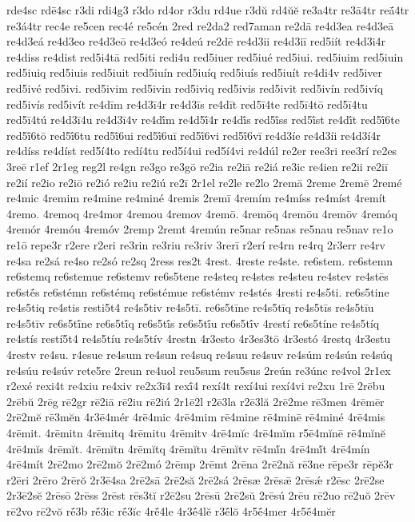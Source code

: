 {rde4sc
rdē4sc
r3di
rdi4g3
r3do
rd4or
r3du
rd4ue
r3dŭ
rd4ŭĕ
re3a4tr
re3ā4tr
reā́4tr
re3á4tr
rec4e
re5cen
rec4é
re5cén
2red
re2da2
red7aman
re2dā
re4d3ea
re4d3eā
re4d3eá
re4d3eo
re4d3eō
re4d3eó
re4deú
re2dē
re4d3ii
re4d3iī
red5iít
re4d3i4r
re4diss
re4dist
red5i4tā
red5iti
redi4u
red5iuer
red5iué
red5iui.
red5iuim
red5iuin
red5iuiq
red5iuis
red5iuit
red5iuín
red5iuíq
red5iuís
red5iuít
re4di4v
red5iver
red5ivé
red5ivi.
red5ivim
red5ivin
red5iviq
red5ivis
red5ivit
red5ivín
red5ivíq
red5ivís
red5ivít
re4dīm
re4d3ī4r
re4d3īs
re4dīt
red5ī4te
red5ī4tō
red5ī4tu
red5ī4tú
re4d3ī4u
re4d3ī4v
re4dī́m
re4d5ī́4r
re4dī́s
red5ī́ss
red5ī́st
re4dī́t
red5ī́6te
red5ī́6tō
red5ī́6tu
red5ī́6ui
red5ī́6uī
red5ī́6vi
red5ī́6vī
re4d3íe
re4d3íi
re4d3í4r
re4díss
re4díst
red5í4to
redí4tu
red5í4ui
red5í4vi
re4dúl
re2er
ree3ri
ree3rí
re2es
3reē
r1ef
2r1eg
reg2l
re4gn
re3go
re3gō
re2ia
re2iā
re2iá
re3ic
re4ien
re2ii
re2iī
re2ií
re2io
re2iō
re2ió
re2iu
re2iú
re2ī
2r1el
re2le
re2lo
2remā
2reme
2remē
2remé
re4mic
4remim
re4mine
re4miné
4remis
2remī
4remím
re4míss
re4míst
4remít
4remo.
4remoq
4re4mor
4remou
4remov
4remō.
4remōq
4remōu
4remōv
4remóq
4remór
4remóu
4remóv
2remp
2remt
4remún
re5nar
re5nas
re5nau
re5nav
re1o
re1ō
repe3r
r2ere
r2eri
re3rin
re3riu
re3riv
3rerī
r2erí
re4rn
re4rq
2r3err
re4rv
re4sa
re2sá
re4so
re2só
re2sq
2ress
res2t
4rest.
4reste
re4ste.
re6stem.
re6stemn
re6stemq
re6stemue
re6stemv
re6s5tene
re4steq
re4stes
re4steu
re4stev
re4stēs
re6stḗs
re6stémn
re6stémq
re6stémue
re6stémv
re4stés
4resti
re4s5ti.
re6s5tine
re4s5tiq
re4stis
resti5t4
re4s5tiv
re4s5tī.
re6s5tīne
re4s5tīq
re4s5tīs
re4s5tīu
re4s5tīv
re6s5tī́ne
re6s5tī́q
re6s5tī́s
re6s5tī́u
re6s5tī́v
4restí
re6s5tíne
re4s5tíq
re4stís
restí5t4
re4s5tíu
re4s5tív
4restn
4r3esto
4r3es3tō
4r3estó
4restq
4r3estu
4restv
re4su.
r4esue
re4sum
re4sun
re4suq
re4suu
re4suv
re4súm
re4sún
re4súq
re4súu
re4súv
rete5re
2reun
re4uol
reu5sum
reu5sus
2reún
re3únc
re4vol
2r1ex
r2exé
rexi4t
re4xiu
re4xiv
re2x3ī4
rexī́4
rexí4t
rexí4ui
rexí4vi
re2xu
1rē
2rēbu
2rēbŭ
2rēg
rē2gr
rē2iā
rē2iu
rē2iú
2r1ē2l
r2ē3la
r2ē3lă
2rē2me
rē3men
4rēmēr
2rē2mĕ
rē3mĕn
4r3ē4mér
4rē4mic
4rē4mim
rē4mine
rē4minē
rē4miné
4rē4mis
4rēmit.
4rēmitn
4rēmitq
4rēmitu
4rēmitv
4rē4mĭc
4rē4mĭm
r5ē4mĭnē
rē4mĭnĕ
4rē4mĭs
4rēmĭt.
4rēmĭtn
4rēmĭtq
4rēmĭtu
4rēmĭtv
rē4mĭ́n
4rē4mĭ́t
4rē4mín
4rē4mít
2rē2mo
2rē2mŏ
2rē2mó
2rēmp
2rēmt
2rēna
2rē2nă
rē3ne
rēpe3r
rēpĕ3r
r2ēri
2rēro
2rērŏ
2r3ē4sa
2rē2sā
2rē2să
2rē2sá
2rēsæ
2rēsǣ
2rēsǽ
r2ēsc
2rē2se
2r3ē2sĕ
2rēsō
2rēss
2rēst
rēs3tĭ
r2ē2su
2rēsū
2rē2sŭ
2rēsú
2rēu
rē2uo
rē2uŏ
2rēv
rē2vo
rē2vŏ
rḗ3b
rḗ3ic
rḗ3ĭc
4rḗ4le
4r3ḗ4lĕ
r3ḗlŏ
4r5ḗ4mer
4r5ḗ4mĕr
}
